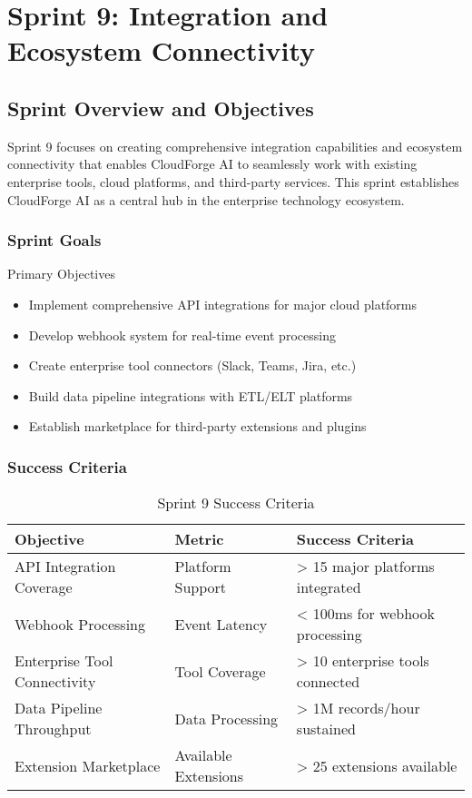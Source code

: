\chapter{Sprint 9: Integration and Ecosystem Connectivity}

\section{Sprint Overview and Objectives}

Sprint 9 focuses on creating comprehensive integration capabilities and ecosystem connectivity that enables CloudForge AI to seamlessly work with existing enterprise tools, cloud platforms, and third-party services. This sprint establishes CloudForge AI as a central hub in the enterprise technology ecosystem.

\subsection{Sprint Goals}

\begin{sprintbox}{Primary Objectives}
\begin{itemize}
    \item Implement comprehensive API integrations for major cloud platforms
    \item Develop webhook system for real-time event processing
    \item Create enterprise tool connectors (Slack, Teams, Jira, etc.)
    \item Build data pipeline integrations with ETL/ELT platforms
    \item Establish marketplace for third-party extensions and plugins
\end{itemize}
\end{sprintbox}

\subsection{Success Criteria}

\begin{table}[H]
\centering
\caption{Sprint 9 Success Criteria}
\begin{tabular}{|p{4cm}|p{3cm}|p{5cm}|}
\hline
\textbf{Objective} & \textbf{Metric} & \textbf{Success Criteria} \\
\hline
API Integration Coverage & Platform Support & > 15 major platforms integrated \\
\hline
Webhook Processing & Event Latency & < 100ms for webhook processing \\
\hline
Enterprise Tool Connectivity & Tool Coverage & > 10 enterprise tools connected \\
\hline
Data Pipeline Throughput & Data Processing & > 1M records/hour sustained \\
\hline
Extension Marketplace & Available Extensions & > 25 extensions available \\
\hline
\end{tabular}
\end{table}

